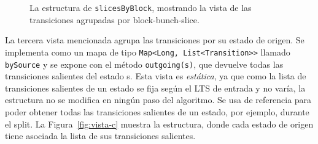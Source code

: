 \begin{figure}[htbp]
{%
  }
  \caption{La estructura de \texttt{slicesByBlock}, mostrando la vista de las transiciones agrupadas por block-bunch-slice.}
  \label{fig:vista-b}
\end{figure}

La tercera vista mencionada agrupa las transiciones por su estado de origen. Se implementa como un mapa de tipo \texttt{Map<Long, List<Transition>>} llamado \texttt{bySource} y se expone con el método \texttt{outgoing(s)}, que devuelve todas las transiciones salientes del estado s. Esta vista es \emph{estática}, ya que como la lista de transiciones salientes de un estado se fija según el LTS de entrada y no varía, la estructura no se modifica en ningún paso del algoritmo. Se usa de referencia para poder obtener todas las transiciones salientes de un estado, por ejemplo, durante el split. La Figura~\ref{fig:vista-c} muestra la estructura, donde cada estado de origen tiene asociada la lista de sus transiciones salientes.

